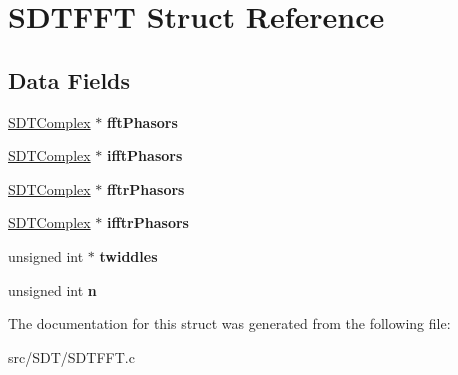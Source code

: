 \hypertarget{struct_s_d_t_f_f_t}{}\section{S\+D\+T\+F\+F\+T Struct Reference}
\label{struct_s_d_t_f_f_t}
\subsection*{Data Fields}
\begin{DoxyCompactItemize}
\item 
\hypertarget{struct_s_d_t_f_f_t_a6014e303befd8bab0ee3738e20cf6f60}{}\hyperlink{struct_s_d_t_complex}{S\+D\+T\+Complex} $\ast$ {\bfseries fft\+Phasors}\label{struct_s_d_t_f_f_t_a6014e303befd8bab0ee3738e20cf6f60}

\item 
\hypertarget{struct_s_d_t_f_f_t_a8ecdd00f5db516d817e1b0e010f666c0}{}\hyperlink{struct_s_d_t_complex}{S\+D\+T\+Complex} $\ast$ {\bfseries ifft\+Phasors}\label{struct_s_d_t_f_f_t_a8ecdd00f5db516d817e1b0e010f666c0}

\item 
\hypertarget{struct_s_d_t_f_f_t_a4e5d36fe01615ac5daf85541597365d7}{}\hyperlink{struct_s_d_t_complex}{S\+D\+T\+Complex} $\ast$ {\bfseries fftr\+Phasors}\label{struct_s_d_t_f_f_t_a4e5d36fe01615ac5daf85541597365d7}

\item 
\hypertarget{struct_s_d_t_f_f_t_a81daea8bd60fae375a99bb038c144e6c}{}\hyperlink{struct_s_d_t_complex}{S\+D\+T\+Complex} $\ast$ {\bfseries ifftr\+Phasors}\label{struct_s_d_t_f_f_t_a81daea8bd60fae375a99bb038c144e6c}

\item 
\hypertarget{struct_s_d_t_f_f_t_a9049e2e7a410654e299fd90749019142}{}unsigned int $\ast$ {\bfseries twiddles}\label{struct_s_d_t_f_f_t_a9049e2e7a410654e299fd90749019142}

\item 
\hypertarget{struct_s_d_t_f_f_t_a7d46b74409bd32b539089ef4721ea544}{}unsigned int {\bfseries n}\label{struct_s_d_t_f_f_t_a7d46b74409bd32b539089ef4721ea544}

\end{DoxyCompactItemize}


The documentation for this struct was generated from the following file\+:\begin{DoxyCompactItemize}
\item 
src/\+S\+D\+T/S\+D\+T\+F\+F\+T.\+c\end{DoxyCompactItemize}
